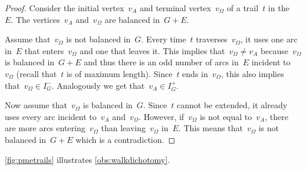 \begin{proof}
  Consider the initial vertex~$v_A$ and terminal vertex~$v_\Omega$ of a trail~$t$ in the \EE~$E$. The vertices~$v_A$ and~$v_\Omega$ are balanced in~$G + E$. 

  Assume that~$v_\Omega$ is not balanced in~$G$. Every time~$t$ traverses~$v_\Omega$, it uses one arc in~$E$ that enters~$v_\Omega$ and one that leaves it. This implies that~$v_\Omega \neq v_A$ because~$v_\Omega$ is balanced in~$G+ E$ and thus there is an odd number of arcs in~$E$ incident to~$v_\Omega$ (recall that~$t$ is of maximum length). Since~$t$ ends in~$v_\Omega$, this also implies that~$v_\Omega \in I^-_G$. Analogously we get that~$v_A \in I^+_G$.
  
  Now assume that~$v_\Omega$ is balanced in~$G$. Since~$t$ cannot be extended, it already uses every arc incident to~$v_A$ and~$v_\Omega$. However, if~$v_\Omega$ is not equal to~$v_A$, there are more arcs entering~$v_\Omega$ than leaving~$v_\Omega$ in~$E$. This means that~$v_\Omega$ is not balanced in~$G + E$ which is a contradiction.
\end{proof}
\autoref{fig:pmetrails} illustrates \autoref{obs:walkdichotomy}.

